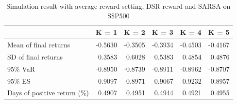 \documentclass{article}
\begin{document}
\begin{table}[H]
\centering
\begin{tabular}{|l|r|r|r|r|r|} 
\hline
                             & \multicolumn{1}{l|}{K = 1} & \multicolumn{1}{l|}{K = 2} & \multicolumn{1}{l|}{K = 3} & \multicolumn{1}{l|}{K = 4} & \multicolumn{1}{l|}{K = 5}  \\ 
\hline
Mean of final returns        & -0.5630                    & -0.3505                    & -0.3934                    & -0.4503                    & -0.4167                     \\ 
\hline
SD of final returns          & 0.3583                     & 0.6028                     & 0.5383                     & 0.4854                     & 0.4876                      \\ 
\hline
95\% VaR                     & -0.8950                    & -0.8739                    & -0.8911                    & -0.8962                    & -0.8707                     \\ 
\hline
95\% ES                      & -0.9097                    & -0.8971                    & -0.9067                    & -0.9232                    & -0.8957                     \\ 
\hline
Days of positive return (\%) & 0.4907                     & 0.4951                     & 0.4944                     & 0.4921                     & 0.4955                      \\
\hline
\end{tabular}
\caption{Simulation result with average-reward setting, DSR reward and SARSA on S\$P500}
\label{table23}
\end{table}
\end{document}
